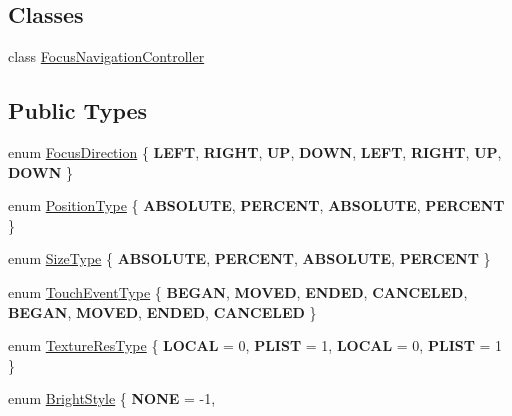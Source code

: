 \subsection*{Classes}
\begin{DoxyCompactItemize}
\item 
class \hyperlink{classui_1_1Widget_1_1FocusNavigationController}{Focus\+Navigation\+Controller}
\end{DoxyCompactItemize}
\subsection*{Public Types}
\begin{DoxyCompactItemize}
\item 
enum \hyperlink{classui_1_1Widget_a8ae8e8fc793a04a87584205cd1e8a8a5}{Focus\+Direction} \{ \newline
{\bfseries L\+E\+FT}, 
{\bfseries R\+I\+G\+HT}, 
{\bfseries UP}, 
{\bfseries D\+O\+WN}, 
\newline
{\bfseries L\+E\+FT}, 
{\bfseries R\+I\+G\+HT}, 
{\bfseries UP}, 
{\bfseries D\+O\+WN}
 \}
\item 
enum \hyperlink{classui_1_1Widget_acfb8004ec169575dab6d3e8eb3e92b90}{Position\+Type} \{ {\bfseries A\+B\+S\+O\+L\+U\+TE}, 
{\bfseries P\+E\+R\+C\+E\+NT}, 
{\bfseries A\+B\+S\+O\+L\+U\+TE}, 
{\bfseries P\+E\+R\+C\+E\+NT}
 \}
\item 
enum \hyperlink{classui_1_1Widget_ab7035fc10a00c756523be6bc57cf801c}{Size\+Type} \{ {\bfseries A\+B\+S\+O\+L\+U\+TE}, 
{\bfseries P\+E\+R\+C\+E\+NT}, 
{\bfseries A\+B\+S\+O\+L\+U\+TE}, 
{\bfseries P\+E\+R\+C\+E\+NT}
 \}
\item 
enum \hyperlink{classui_1_1Widget_a4829c0f1cbaf1fd820a9b2ccf0c58c73}{Touch\+Event\+Type} \{ \newline
{\bfseries B\+E\+G\+AN}, 
{\bfseries M\+O\+V\+ED}, 
{\bfseries E\+N\+D\+ED}, 
{\bfseries C\+A\+N\+C\+E\+L\+ED}, 
\newline
{\bfseries B\+E\+G\+AN}, 
{\bfseries M\+O\+V\+ED}, 
{\bfseries E\+N\+D\+ED}, 
{\bfseries C\+A\+N\+C\+E\+L\+ED}
 \}
\item 
enum \hyperlink{classui_1_1Widget_a040a65ec5ad3b11119b7e16b98bd9af0}{Texture\+Res\+Type} \{ {\bfseries L\+O\+C\+AL} = 0, 
{\bfseries P\+L\+I\+ST} = 1, 
{\bfseries L\+O\+C\+AL} = 0, 
{\bfseries P\+L\+I\+ST} = 1
 \}
\item 
enum \hyperlink{classui_1_1Widget_a4040e89d49e005b771ac8a80a13206fc}{Bright\+Style} \{ \newline
{\bfseries N\+O\+NE} = -\/1, 

\end{DoxyCompactItemize}
